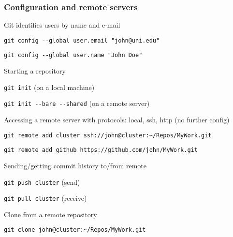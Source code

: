 \documentclass[xcolor=dvipsnames,10pt]{beamer}
\begin{document}
\begin{frame}
 \frametitle{Configuration and remote servers}
 
 \begin{itemize}
  \item Git identifies users by name and e-mail
  
  \texttt{git config -{}-global user.email "john@uni.edu"}
  
  \texttt{git config -{}-global user.name "John Doe"}
  \vspace*{0.3cm}
  
  \item Starting a repository
  
  \texttt{git init} (on a local machine)
  
  \texttt{git init -{}-bare -{}-shared} (on a remote server)
  \vspace*{0.3cm}
  
  \begin{minipage}{1.1\textwidth}
  \item Accessing a remote server with protocols: local, ssh, http (no further config)
  
  \texttt{git remote add {\color{blue}cluster} ssh://john@cluster:\textasciitilde/Repos/MyWork.git}
  
  \texttt{git remote add {\color{blue}github} https://github.com/john/MyWork.git}
  \end{minipage}
  \vspace*{0.3cm}
  
  \item Sending/getting commit history to/from remote
  
  \texttt{git push {\color{blue}cluster}} (send)
  
  \texttt{git pull {\color{blue}cluster}} (receive)
  \vspace*{0.3cm}
  
  \item Clone from a remote repository
  
  \texttt{git clone john@cluster:\textasciitilde/Repos/MyWork.git}
  
 \end{itemize}

\end{frame}
\end{document}
